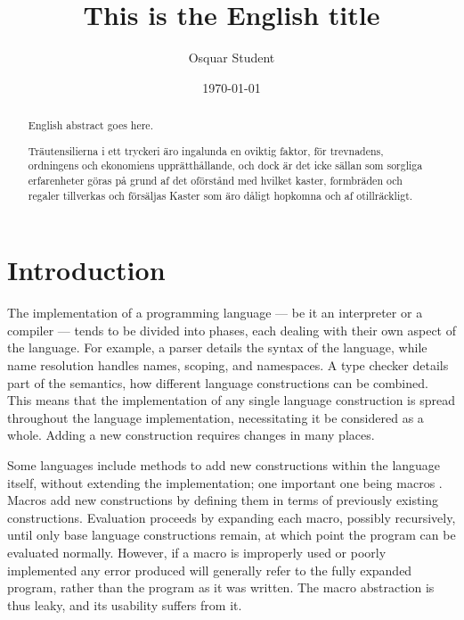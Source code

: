 \documentclass{kththesis}
\title{This is the English title}
\author{Osquar Student}
\date{\today}
\begin{document}
\frontmatter

\titlepage

\begin{abstract}
  English abstract goes here.

  \blindtext
\end{abstract}


\begin{otherlanguage}{swedish}
  \begin{abstract}
    Träutensilierna i ett tryckeri äro ingalunda en oviktig faktor,
    för trevnadens, ordningens och ekonomiens upprätthållande, och
    dock är det icke sällan som sorgliga erfarenheter göras på grund
    af det oförstånd med hvilket kaster, formbräden och regaler
    tillverkas och försäljas Kaster som äro dåligt hopkomna och af
    otillräckligt.
  \end{abstract}
\end{otherlanguage}


\tableofcontents


\mainmatter


\chapter{Introduction}

The implementation of a programming language --- be it an interpreter or a compiler --- tends to be divided into phases, each dealing with their own aspect of the language. For example, a parser details the syntax of the language, while name resolution handles names, scoping, and namespaces. A type checker details part of the semantics, how different language constructions can be combined. This means that the implementation of any single language construction is spread throughout the language implementation, necessitating it be considered as a whole. Adding a new construction requires changes in many places.

Some languages include methods to add new constructions within the language itself, without extending the implementation; one important one being macros \cite{plt-tr1,Hickey2008,Matsakis2014}. Macros add new constructions by defining them in terms of previously existing constructions. Evaluation proceeds by expanding each macro, possibly recursively, until only base language constructions remain, at which point the program can be evaluated normally. However, if a macro is improperly used or poorly implemented any error produced will generally refer to the fully expanded program, rather than the program as it was written. The macro abstraction is thus leaky, and its usability suffers from it.
\end{document}
